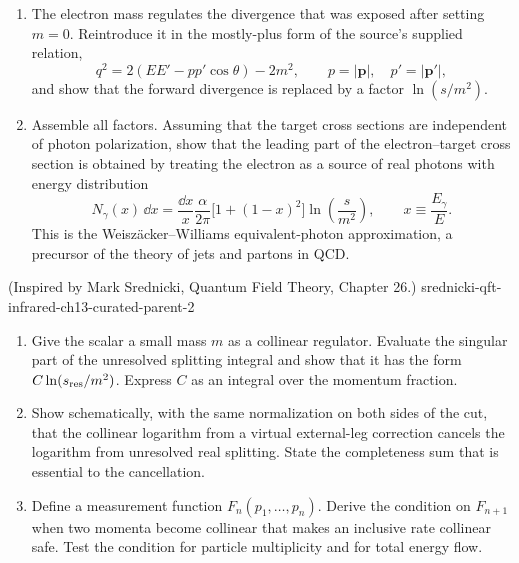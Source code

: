 \begin{enumerate}
\begin{enumerate}
\(\mathbf p'_\perp\) diverges logarithmically as
\(\mathbf p'_\perp\), or equivalently \(\theta\), tends to zero.
\item
The electron mass regulates the divergence that was exposed after setting
\(m=0\).  Reintroduce it in the mostly-plus form of the source's supplied
relation,
\[
 q^2=2(EE'-pp'\cos\theta)-2m^2,
 \qquad p=\lvert\mathbf p\rvert,\quad
 p'=\lvert\mathbf p'\rvert,
\]
and show that the forward divergence is replaced by a factor
\(\ln(s/m^2)\).
\item
Assemble all factors.  Assuming that the target cross sections are
independent of photon polarization, show that the leading part of the
electron--target cross section is obtained by treating the electron as a
source of real photons with energy distribution
\[
 N_\gamma(x)\,\dd x
 =\frac{\dd x}{x}\frac{\alpha}{2\pi}
 \bigl[1+(1-x)^2\bigr]\ln\!\left(\frac{s}{m^2}\right),
 \qquad x\equiv\frac{E_\gamma}{E}.
\]
This is the Weisz\"acker--Williams equivalent-photon approximation, a
precursor of the theory of jets and partons in QCD.
\end{enumerate}

  {(Inspired by Mark Srednicki, Quantum Field Theory, Chapter 26.)}
  {srednicki-qft-infrared-ch13-curated-parent-2}
\begin{enumerate}
\item
Give the scalar a small mass \(m\) as a collinear regulator.  Evaluate the
singular part of the unresolved splitting integral and show that it has
the form \(C\ln(s_{\rm res}/m^2)\).  Express \(C\) as an integral over the
momentum fraction.
\item
Show schematically, with the same normalization on both sides of the cut,
that the collinear logarithm from a virtual external-leg correction cancels
the logarithm from unresolved real splitting.  State the completeness sum
that is essential to the cancellation.
\item
Define a measurement function \(F_n(p_1,\ldots,p_n)\).  Derive the condition
on \(F_{n+1}\) when two momenta become collinear that makes an inclusive
rate collinear safe.  Test the condition for particle multiplicity and for
total energy flow.
\end{enumerate}


\end{enumerate}
